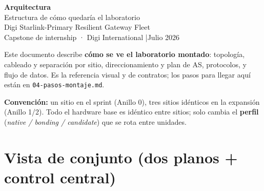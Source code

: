 \documentclass[11pt,a4paper]{article}
\newcommand{\file}[1]{\texttt{#1}}
\begin{document}
\begin{center}
  {\Huge\bfseries\color{accentdark} Arquitectura}\\[6pt]
  {\large Estructura de cómo quedaría el laboratorio}\\[2pt]
  {\normalsize Digi Starlink-Primary Resilient Gateway Fleet}\\[10pt]
  {\small Capstone de internship · Digi International \quad|\quad Julio 2026}
\end{center}

\vspace{4pt}
\begin{nota}
\small
Este documento describe \textbf{cómo se ve el laboratorio montado}: topología, cableado y
separación por sitio, direccionamiento y plan de AS, protocolos, y flujo de datos.
Es la referencia visual y de contratos; los pasos para llegar aquí están en
\file{04-pasos-montaje.md}.

\medskip
\textbf{Convención:} un sitio en el sprint (Anillo 0), tres sitios idénticos en la expansión
(Anillo 1/2). Todo el hardware base es idéntico entre sitios; solo cambia el
\textbf{perfil} (\textit{native / bonding / candidate}) que se rota entre unidades.
\end{nota}

\vspace{2pt}
{\small\tableofcontents}
\vspace{6pt}

\section{Vista de conjunto (dos planos + control central)}
\end{document}
